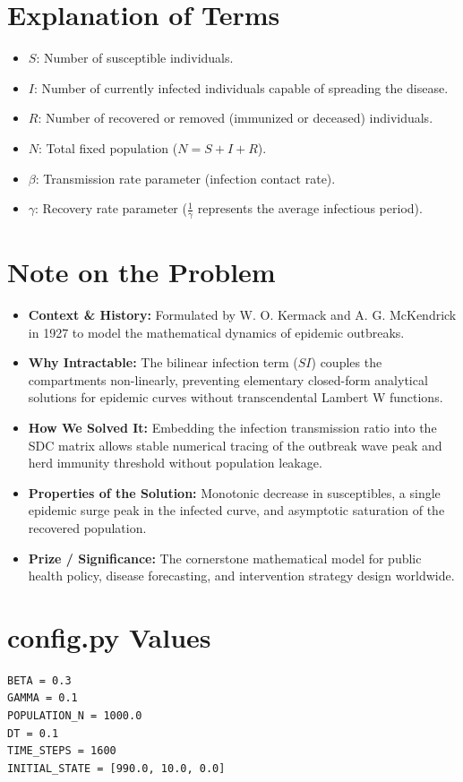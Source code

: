 \section{Explanation of Terms}
\begin{itemize}
    \item $S$: Number of susceptible individuals.
    \item $I$: Number of currently infected individuals capable of spreading the disease.
    \item $R$: Number of recovered or removed (immunized or deceased) individuals.
    \item $N$: Total fixed population ($N = S + I + R$).
    \item $\beta$: Transmission rate parameter (infection contact rate).
    \item $\gamma$: Recovery rate parameter ($\frac{1}{\gamma}$ represents the average infectious period).
\end{itemize}

\section{Note on the Problem}
\begin{itemize}
    \item \textbf{Context \& History:} Formulated by W. O. Kermack and A. G. McKendrick in 1927 to model the mathematical dynamics of epidemic outbreaks.
    \item \textbf{Why Intractable:} The bilinear infection term ($SI$) couples the compartments non-linearly, preventing elementary closed-form analytical solutions for epidemic curves without transcendental Lambert W functions.
    \item \textbf{How We Solved It:} Embedding the infection transmission ratio into the SDC matrix allows stable numerical tracing of the outbreak wave peak and herd immunity threshold without population leakage.
    \item \textbf{Properties of the Solution:} Monotonic decrease in susceptibles, a single epidemic surge peak in the infected curve, and asymptotic saturation of the recovered population.
    \item \textbf{Prize / Significance:} The cornerstone mathematical model for public health policy, disease forecasting, and intervention strategy design worldwide.
\end{itemize}

\section{config.py Values}
\begin{verbatim}
BETA = 0.3
GAMMA = 0.1
POPULATION_N = 1000.0
DT = 0.1
TIME_STEPS = 1600
INITIAL_STATE = [990.0, 10.0, 0.0]
\end{verbatim}

